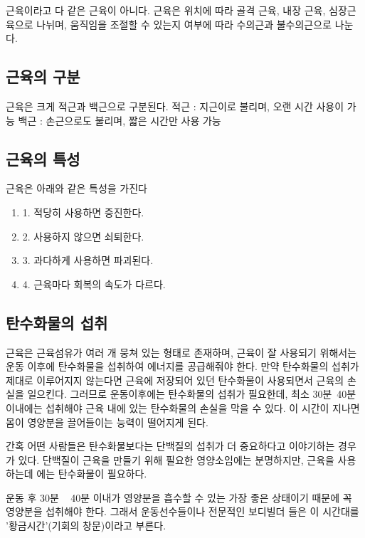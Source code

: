 \documentclass[12pt, a4paper, oneside]{book}
\begin{document}
근육이라고 다 같은 근육이 아니다.
근육은 위치에 따라 골격 근육, 내장 근육, 심장근육으로 나뉘며, 
움직임을 조절할 수 있는지 여부에 따라 수의근과 불수의근으로 나눈다.

	\subsection{근육의 구분}

근육은 크게 적근과 백근으로 구분된다.
적근 : 지근이로 불리며, 오랜 시간 사용이 가능
백근 : 손근으로도 불리며, 짧은 시간만 사용 가능




	\subsection{근육의 특성}

		근육은 아래와 같은 특성을 가진다	

			\begin{enumerate}	
							[
							topsep=0.0em, 
							parsep=0.0em, 
							itemsep=0em, 
							leftmargin=12.0em, 
							labelwidth=3em, 
							labelsep=3em
							] 
			\item 1. 적당히 사용하면 증진한다.
			\item 2. 사용하지 않으면 쇠퇴한다.
			\item 3. 과다하게 사용하면 파괴된다.
			\item 4. 근육마다 회복의 속도가 다르다.
			\end{enumerate}



	\subsection{탄수화물의 섭취}
	
근육은 근육섬유가 여러 개 뭉쳐 있는 형태로 존재하며, 근육이 잘 사용되기 위해서는 운동 이후에 탄수화물을 섭취하여 에너지를  공급해줘야 한다.
만약 탄수화물의 섭취가 제대로 이루어지지 않는다면 근육에 저장되어 있던 탄수화물이 사용되면서 근육의 손실을 일으킨다.
그러므로 운동이후에는 탄수화물의 섭취가 필요한데, 최소 30분~40분 이내에는 섭취해야 근육 내에 있는 탄수화물의 손실을 막을 수 있다.
이 시간이 지나면 몸이 영양분을 끌어들이는 능력이 떨어지게 된다.

간혹 어떤 사람들은 탄수화물보다는 단백질의 섭취가 더 중요하다고 이야기하는 경우가 있다.
단백질이 근육을 만들기 위해 필요한 영양소임에는 분명하지만, 근육을 사용하는데 에는 탄수화물이 필요하다.

운동 후 30분 ~ 40분 이내가 영양분을 흡수할 수 있는 가장 좋은 상태이기 때문에 꼭 영양분을 섭취해야 한다.
그래서 운동선수들이나 전문적인 보디빌더 들은 이 시간대를 '황금시간'(기회의 창문)이라고 부른다.
\end{document}
